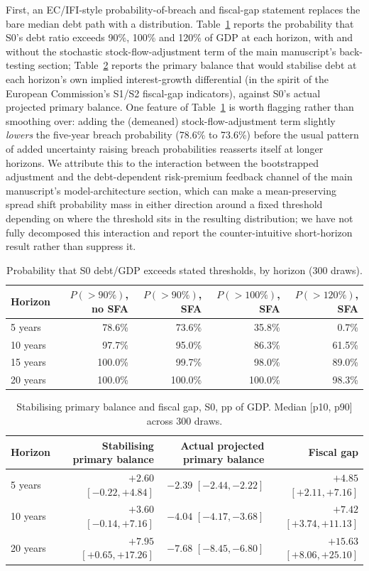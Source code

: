 \documentclass[11pt,a4paper]{article}
\begin{document}
First, an EC/IFI-style probability-of-breach and fiscal-gap statement replaces the bare median debt path with a distribution. Table~\ref{tab:d4breach} reports the probability that \textsc{S0}'s debt ratio exceeds 90\%, 100\% and 120\% of GDP at each horizon, with and without the stochastic stock-flow-adjustment term of the main manuscript's back-testing section; Table~\ref{tab:d4gap} reports the primary balance that would stabilise debt at each horizon's own implied interest-growth differential (in the spirit of the European Commission's S1/S2 fiscal-gap indicators), against \textsc{S0}'s actual projected primary balance. One feature of Table~\ref{tab:d4breach} is worth flagging rather than smoothing over: adding the (demeaned) stock-flow-adjustment term slightly \emph{lowers} the five-year breach probability (78.6\% to 73.6\%) before the usual pattern of added uncertainty raising breach probabilities reasserts itself at longer horizons. We attribute this to the interaction between the bootstrapped adjustment and the debt-dependent risk-premium feedback channel of the main manuscript's model-architecture section, which can make a mean-preserving spread shift probability mass in either direction around a fixed threshold depending on where the threshold sits in the resulting distribution; we have not fully decomposed this interaction and report the counter-intuitive short-horizon result rather than suppress it.

\begin{table}[htbp]
\centering\small
\caption{Probability that \textsc{S0} debt/GDP exceeds stated thresholds, by horizon (300 draws).}
\label{tab:d4breach}
\begin{tabular}{lrrrr}
\toprule
Horizon & $P(>90\%)$, no SFA & $P(>90\%)$, SFA & $P(>100\%)$, SFA & $P(>120\%)$, SFA \\
\midrule
5 years & 78.6\% & 73.6\% & 35.8\% & 0.7\% \\
10 years & 97.7\% & 95.0\% & 86.3\% & 61.5\% \\
15 years & 100.0\% & 99.7\% & 98.0\% & 89.0\% \\
20 years & 100.0\% & 100.0\% & 100.0\% & 98.3\% \\
\bottomrule
\end{tabular}
\end{table}

\begin{table}[htbp]
\centering\small
\caption{Stabilising primary balance and fiscal gap, \textsc{S0}, pp of GDP. Median [p10, p90] across 300 draws.}
\label{tab:d4gap}
\begin{tabular}{lrrr}
\toprule
Horizon & Stabilising primary balance & Actual projected primary balance & Fiscal gap \\
\midrule
5 years & $+2.60$ $[-0.22,+4.84]$ & $-2.39$ $[-2.44,-2.22]$ & $+4.85$ $[+2.11,+7.16]$ \\
10 years & $+3.60$ $[-0.14,+7.16]$ & $-4.04$ $[-4.17,-3.68]$ & $+7.42$ $[+3.74,+11.13]$ \\
20 years & $+7.95$ $[+0.65,+17.26]$ & $-7.68$ $[-8.45,-6.80]$ & $+15.63$ $[+8.06,+25.10]$ \\
\bottomrule
\end{tabular}
\end{table}
\end{document}
